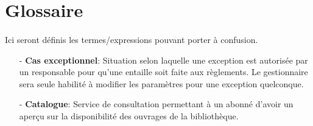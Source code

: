 \section*{Glossaire}
\paragraph{} Ici seront définis les termes/expressions pouvant porter à confusion.\par
 \begin{enumerate}
     \item[-] \textbf{Cas exceptionnel}: Situation selon laquelle une exception est autorisée 
     par un responsable pour qu’une entaille soit faite aux règlements. 
     Le gestionnaire sera seule habilité à modifier les paramètres pour une 
     exception quelconque.
     \item[-] \textbf{Catalogue}: Service de consultation permettant à un abonné d’avoir 
     un aperçu sur la disponibilité des ouvrages de la bibliothèque.
    
 \end{enumerate}
  